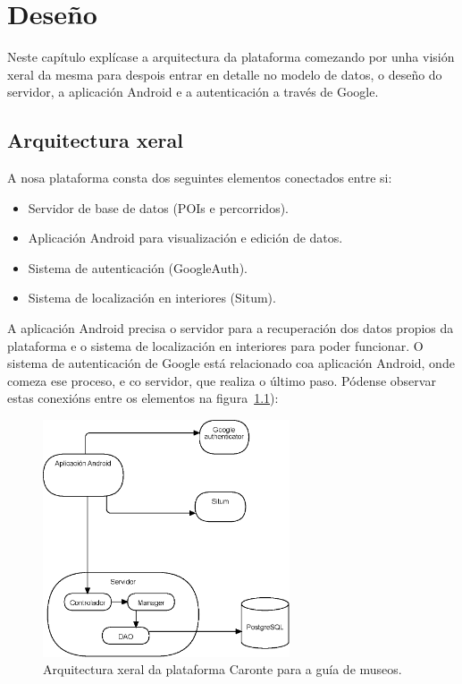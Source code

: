 \chapter{Deseño}
Neste capítulo explícase a arquitectura da plataforma comezando por unha visión xeral da mesma para despois entrar en detalle no modelo de datos, o deseño do servidor, a aplicación Android e a autenticación a través de Google.


\section{Arquitectura xeral}

A nosa plataforma consta dos seguintes elementos conectados entre si:
\begin{itemize}
	\item Servidor de base de datos (POIs e percorridos).
	\item Aplicación Android para visualización e edición de datos.
	\item Sistema de autenticación (GoogleAuth).
	\item Sistema de localización en interiores (Situm).
\end{itemize}

A aplicación Android precisa o servidor para a recuperación dos datos propios da plataforma e o sistema de localización en interiores para poder funcionar. O sistema de autenticación de Google está relacionado coa aplicación Android, onde comeza ese proceso, e co servidor, que realiza o último paso. Pódense observar estas conexións entre os elementos na figura~\ref{fig:arq_xeral}):


\begin{figure}[!h] 
	\begin{center}
		\includegraphics[width=0.65\textwidth]{figures/diagrama/arquitecturaGlobalSistema}
		\caption{Arquitectura xeral da plataforma Caronte para a guía de museos.}
		\label{fig:arq_xeral}
	\end{center}
\end{figure}

